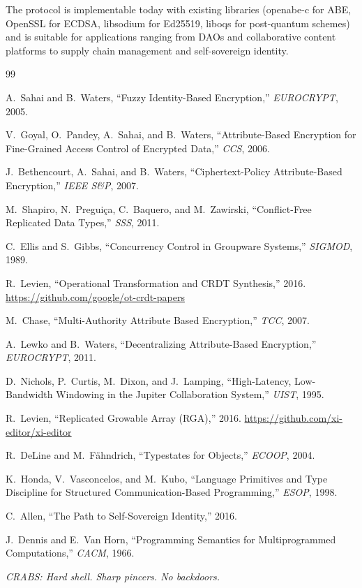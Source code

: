 \documentclass[sigconf,nonacm]{acmart}
\newcommand{\crab}{\textsc{CRABS}}
\begin{document}
The protocol is implementable today with existing libraries (openabe-c for ABE, OpenSSL for ECDSA, libsodium for Ed25519, liboqs for post-quantum schemes) and is suitable for applications ranging from DAOs and collaborative content platforms to supply chain management and self-sovereign identity.

\begin{thebibliography}{99}

A.~Sahai and B.~Waters, ``Fuzzy Identity-Based Encryption,'' \textit{EUROCRYPT}, 2005.

V.~Goyal, O.~Pandey, A.~Sahai, and B.~Waters, ``Attribute-Based Encryption for Fine-Grained Access Control of Encrypted Data,'' \textit{CCS}, 2006.

J.~Bethencourt, A.~Sahai, and B.~Waters, ``Ciphertext-Policy Attribute-Based Encryption,'' \textit{IEEE S\&P}, 2007.

M.~Shapiro, N.~Pregui\c{c}a, C.~Baquero, and M.~Zawirski, ``Conflict-Free Replicated Data Types,'' \textit{SSS}, 2011.

C.~Ellis and S.~Gibbs, ``Concurrency Control in Groupware Systems,'' \textit{SIGMOD}, 1989.

R.~Levien, ``Operational Transformation and CRDT Synthesis,'' 2016. \url{https://github.com/google/ot-crdt-papers}

M.~Chase, ``Multi-Authority Attribute Based Encryption,'' \textit{TCC}, 2007.

A.~Lewko and B.~Waters, ``Decentralizing Attribute-Based Encryption,'' \textit{EUROCRYPT}, 2011.

D.~Nichols, P.~Curtis, M.~Dixon, and J.~Lamping, ``High-Latency, Low-Bandwidth Windowing in the Jupiter Collaboration System,'' \textit{UIST}, 1995.

R.~Levien, ``Replicated Growable Array (RGA),'' 2016. \url{https://github.com/xi-editor/xi-editor}

R.~DeLine and M.~F\"{a}hndrich, ``Typestates for Objects,'' \textit{ECOOP}, 2004.

K.~Honda, V.~Vasconcelos, and M.~Kubo, ``Language Primitives and Type Discipline for Structured Communication-Based Programming,'' \textit{ESOP}, 1998.

C.~Allen, ``The Path to Self-Sovereign Identity,'' 2016.

J.~Dennis and E.~Van Horn, ``Programming Semantics for Multiprogrammed Computations,'' \textit{CACM}, 1966.

\end{thebibliography}

\vspace{12pt}
\begin{center}
\textit{\crab{}: Hard shell. Sharp pincers. No backdoors.}
\end{center}
\end{document}

